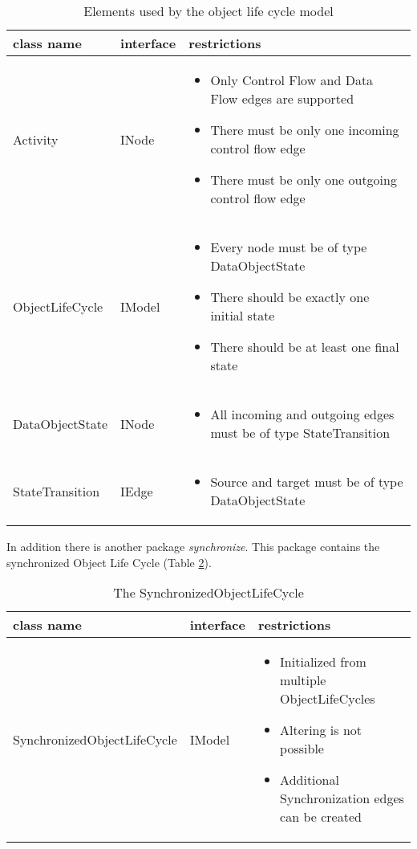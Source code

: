 \begin{table}[h]
	\centering
	\begin{tabular}{|l|l|p{10cm}|}
		\hline
		\textbf{class name} & \textbf{interface} & \textbf{restrictions}\\
		\hline
		Activity & INode & \begin{itemize}
					\item Only Control Flow and Data Flow edges are supported
					\item There must be only one incoming control flow edge
					\item There must be only one outgoing control flow edge
				\end{itemize}\\
		\hline
		ObjectLifeCycle & IModel & \begin{itemize}
			\item Every node must be of type DataObjectState
			\item There should be exactly one initial state
			\item There should be at least one final state
		\end{itemize}\\
		\hline
		DataObjectState & INode & \begin{itemize}
									\item All incoming and outgoing edges must be of type StateTransition
								\end{itemize}\\
		\hline
		StateTransition & IEdge & \begin{itemize}
									\item Source and target must be of type DataObjectState
								\end{itemize}\\
		\hline
	\end{tabular}
	\caption{Elements used by the object life cycle model}
	\label{tbl:olc_elements}
\end{table}

In addition there is another package \textit{synchronize}. This package contains the synchronized Object Life Cycle (Table \ref{tbl:synchronize_olc}).

\begin{table}[h]
	\centering
	\begin{tabular}{|l|l|p{8cm}|}
		\hline
		\textbf{class name} & \textbf{interface} & \textbf{restrictions}\\
		\hline
		SynchronizedObjectLifeCycle & IModel & \begin{itemize}
					\item Initialized from multiple ObjectLifeCycles
					\item Altering is not possible
					\item Additional Synchronization edges can be created
				\end{itemize}\\
		\hline
	\end{tabular}
	\caption{The SynchronizedObjectLifeCycle}
	\label{tbl:synchronize_olc}
\end{table}

